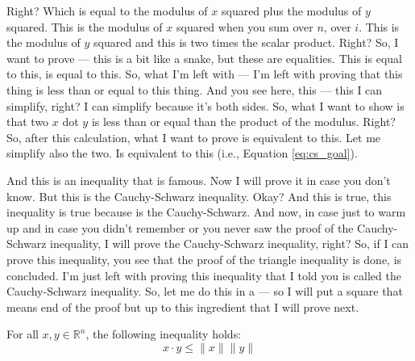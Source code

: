\begin{spoken-clean}[00:03:28 - 00:05:50]
Right? Which is equal to the modulus of $x$ squared plus the modulus of $y$ squared. This is the modulus of $x$ squared when you sum over $n$, over $i$. This is the modulus of $y$ squared and this is two times the scalar product. Right? So, I want to prove --- this is a bit like a snake, but these are equalities. This is equal to this, is equal to this. So, what I'm left with --- I'm left with proving that this thing is less than or equal to this thing. And you see here, this --- this I can simplify, right? I can simplify because it's both sides. So, what I want to show is that two $x$ dot $y$ is less than or equal than the product of the modulus. Right? So, after this calculation, what I want to prove is equivalent to this. Let me simplify also the two. Is equivalent to this (i.e., Equation \ref{eq:cs_goal}).

And this is an inequality that is famous. Now I will prove it in case you don't know. But this is the Cauchy-Schwarz inequality. Okay? And this is true, this inequality is true because is the Cauchy-Schwarz.  And now, in case just to warm up and in case you didn't remember or you never saw the proof of the Cauchy-Schwarz inequality, I will prove the Cauchy-Schwarz inequality, right? So, if I can prove this inequality, you see that the proof of the triangle inequality is done, is concluded. I'm just left with proving this inequality that I told you is called the Cauchy-Schwarz inequality. So, let me do this in a --- so I will put a square that means end of the proof but up to this ingredient that I will prove next.
\end{spoken-clean}

\begin{nice-box}
\setcounter{theorem}{2}
\begin{lemma} \label{lem:cauchy_schwarz}
For all $x, y \in \mathbb{R}^n$, the following inequality holds:
\begin{equation} \label{eq:cauchy_schwarz}
x \cdot y \le \|x\|\|y\|
\end{equation}
\end{lemma}
\end{nice-box}


